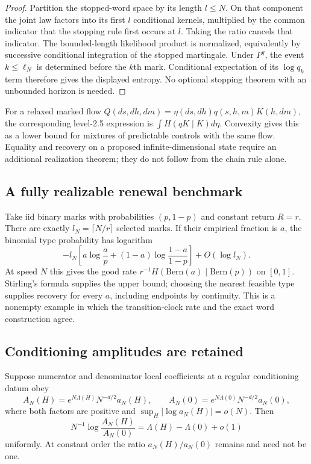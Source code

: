 \begin{proof}
Partition the stopped-word space by its length $l\le N$. On that component the joint law factors into its first $l$ conditional kernels, multiplied by the common indicator that the stopping rule first occurs at $l$. Taking the ratio cancels that indicator. The bounded-length likelihood product is normalized, equivalently by successive conditional integration of the stopped martingale. Under $P^q$, the event $k\le\ell_N$ is determined before the $k$th mark. Conditional expectation of its $\log q_k$ term therefore gives the displayed entropy. No optional stopping theorem with an unbounded horizon is needed.
\end{proof}

For a relaxed marked flow $Q(ds,dh,dm)=\eta(ds,dh)q(s,h,m)K(h,dm)$, the corresponding level-2.5 expression is $\int H(qK\mid K)d\eta$. Convexity gives this as a lower bound for mixtures of predictable controls with the same flow. Equality and recovery on a proposed infinite-dimensional state require an additional realization theorem; they do not follow from the chain rule alone.

\subsection{A fully realizable renewal benchmark}
Take iid binary marks with probabilities $(p,1-p)$ and constant return $R=r$. There are exactly $l_N=\lceil N/r\rceil$ selected marks. If their empirical fraction is $a$, the binomial type probability has logarithm
\[
 -l_N\left[a\log\frac ap+(1-a)\log\frac{1-a}{1-p}\right]+O(\log l_N).
\]
At speed $N$ this gives the good rate $r^{-1}H(\mathrm{Bern}(a)\mid\mathrm{Bern}(p))$ on $[0,1]$. Stirling's formula supplies the upper bound; choosing the nearest feasible type supplies recovery for every $a$, including endpoints by continuity. This is a nonempty example in which the transition-clock rate and the exact word construction agree.

\subsection{Conditioning amplitudes are retained}
\begin{proposition}
\label{prop:r33-a3-conditioning}
Suppose numerator and denominator local coefficients at a regular conditioning datum obey
\[
 A_N(H)=e^{N\Lambda(H)}N^{-d/2}a_N(H),\qquad
 A_N(0)=e^{N\Lambda(0)}N^{-d/2}a_N(0),
\]
where both factors are positive and $\sup_H|\log a_N(H)|=o(N)$. Then
\[
 N^{-1}\log\frac{A_N(H)}{A_N(0)}
 =\Lambda(H)-\Lambda(0)+o(1)
\]
uniformly. At constant order the ratio $a_N(H)/a_N(0)$ remains and need not be one.
\end{proposition}

